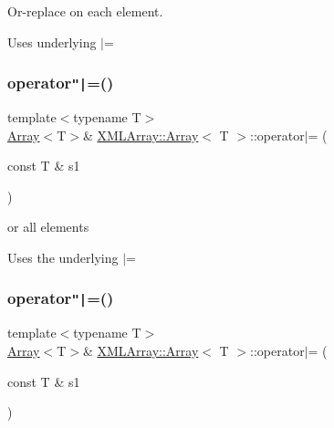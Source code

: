 Or-\/replace on each element. 

Uses underlying $\vert$= \mbox{\label{classXMLArray_1_1Array_a719213ff71df03fd3e561d1d4f9656cc}} 
\subsubsection{\texorpdfstring{operator\texttt{"|}=()}{operator|=()}\hspace{0.1cm}{\footnotesize\ttfamily [4/6]}}
{\footnotesize\ttfamily template$<$typename T$>$ \\
\mbox{\hyperlink{classXMLArray_1_1Array}{Array}}$<$T$>$\& \mbox{\hyperlink{classXMLArray_1_1Array}{X\+M\+L\+Array\+::\+Array}}$<$ T $>$\+::operator$\vert$= (\begin{DoxyParamCaption}\item[{const T \&}]{s1 }\end{DoxyParamCaption})\hspace{0.3cm}{\ttfamily [inline]}}



or all elements 

Uses the underlying $\vert$= \mbox{\label{classXMLArray_1_1Array_a719213ff71df03fd3e561d1d4f9656cc}} 
\subsubsection{\texorpdfstring{operator\texttt{"|}=()}{operator|=()}\hspace{0.1cm}{\footnotesize\ttfamily [5/6]}}
{\footnotesize\ttfamily template$<$typename T$>$ \\
\mbox{\hyperlink{classXMLArray_1_1Array}{Array}}$<$T$>$\& \mbox{\hyperlink{classXMLArray_1_1Array}{X\+M\+L\+Array\+::\+Array}}$<$ T $>$\+::operator$\vert$= (\begin{DoxyParamCaption}\item[{const T \&}]{s1 }\end{DoxyParamCaption})\hspace{0.3cm}{\ttfamily [inline]}}



